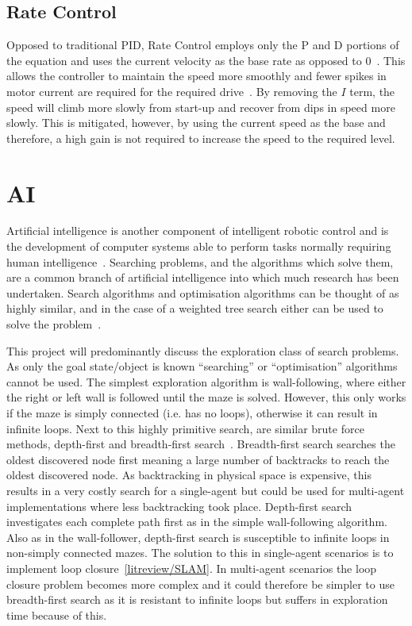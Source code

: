 \subsection{Rate Control}\label{litreview/robotics/ratecontrol}
Opposed to traditional PID, Rate Control employs only the P and D portions of the equation and uses the current velocity as the base rate as opposed to 0~\cite{koditschek1987quadratic}. This allows the controller to maintain the speed more smoothly and fewer spikes in motor current are required for the required drive~\cite{kawamura1988local}. By removing the $I$ term, the speed will climb more slowly from start-up and recover from dips in speed more slowly. This is mitigated, however, by using the current speed as the base and therefore, a high gain is not required to increase the speed to the required level. 

\section{AI}\label{litreview/ai}
Artificial intelligence is another component of intelligent robotic control and is the development of computer systems able to perform tasks normally requiring human intelligence~\cite{russell2016artificial}. Searching problems, and the algorithms which solve them, are a common branch of artificial intelligence into which much research has been undertaken. Search algorithms and optimisation algorithms can be thought of as highly similar, and in the case of a weighted tree search either can be used to solve the problem~\cite{kanal2012search}. 
	 
This project will predominantly discuss the exploration class of search problems. As only the goal state/object is known ``searching'' or ``optimisation'' algorithms cannot be used. The simplest exploration algorithm is wall-following, where either the right or left wall is followed until the maze is solved. However, this only works if the maze is simply connected (i.e. has no loops), otherwise it can result in infinite loops. Next to this highly primitive search, are similar brute force methods, depth-first and breadth-first search~\cite{korf1996artificial}. Breadth-first search searches the oldest discovered node first meaning a large number of backtracks to reach the oldest discovered node. As backtracking in physical space is expensive, this results in a very costly search for a single-agent but could be used for multi-agent implementations where less backtracking took place. Depth-first search investigates each complete path first as in the simple wall-following algorithm. Also as in the wall-follower, depth-first search is susceptible to infinite loops in non-simply connected mazes. The solution to this in single-agent scenarios is to implement loop closure~\ref{litreview/SLAM}. In multi-agent scenarios the loop closure problem becomes more complex and it could therefore be simpler to use breadth-first search as it is resistant to infinite loops but suffers in exploration time because of this. 

